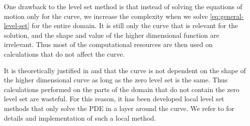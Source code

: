One drawback to the level set method is that instead of solving the equations of motion only for the curve, we increase the complexity when we solve \eqref{eq:general-level-set} for the entire domain. It is still only the curve that is relevant for the solution, and the shape and value of the higher dimensional function are irrelevant. Thus most of the computational resources are then used on calculations that do not affect the curve. 

It is theoretically justified in \cite{MR1100211} and \cite{MR1100206} that the curve is not dependent on the shape of the higher dimensional curve as long as the zero level set is the same. Thus calculations performed on the parts of the domain that do not contain the zero level set are wasteful. For this reason, it has been developed local level set methods that only solve the PDE in a layer around the curve. We refer to \cite{Fast-PDE} for details and implementation of such a local method.

%


